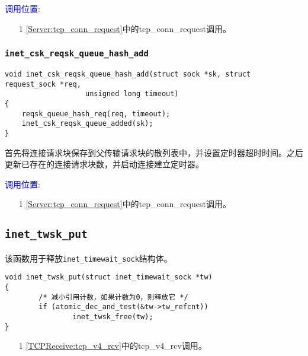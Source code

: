         \textcolor{blue}{调用位置}:

            \begin{enumerate}
                \item[1]        \ref{Server:tcp_conn_request}中的tcp\_conn\_request调用。
            \end{enumerate}

        \subsubsection{\texttt{inet_csk_reqsk_queue_hash_add}}
            \label{INET:inet_csk_reqsk_queue_hash_add}
\begin{verbatim}
void inet_csk_reqsk_queue_hash_add(struct sock *sk, struct request_sock *req,
                   unsigned long timeout)
{
    reqsk_queue_hash_req(req, timeout);
    inet_csk_reqsk_queue_added(sk);
}
\end{verbatim}

        首先将连接请求块保存到父传输请求块的散列表中，并设置定时器超时时间。之后更新已存在的连接请求块数，并启动连接建立定时器。

        \textcolor{blue}{调用位置}:

            \begin{enumerate}
                \item[1]        \ref{Server:tcp_conn_request}中的tcp\_conn\_request调用。
            \end{enumerate}

    \subsection{\texttt{inet_twsk_put}}
        \label{INET:inet_twsk_put}
        该函数用于释放\texttt{inet_timewait_sock}结构体。
\begin{verbatim}
void inet_twsk_put(struct inet_timewait_sock *tw)
{
        /* 减小引用计数，如果计数为0，则释放它 */
        if (atomic_dec_and_test(&tw->tw_refcnt))
                inet_twsk_free(tw);
}
\end{verbatim}

        \begin{enumerate}
            \item[1]        \ref{TCPReceive:tcp_v4_rcv}中的tcp\_v4\_rcv调用。
        \end{enumerate}

    
